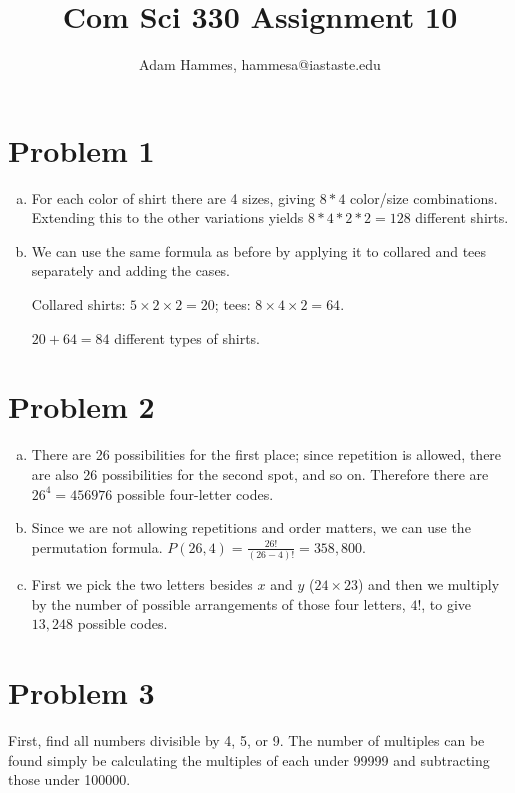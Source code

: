 \documentclass[11pt]{article}
\begin{document}
\let\iff\leftrightarrow

\title{Com Sci 330 Assignment 10}
\author{Adam Hammes, hammesa@iastaste.edu}
\maketitle

\section*{Problem 1}
\begin{enumerate}[(a)]
	\item
	For each color of shirt there are 4 sizes, giving $8*4$ color/size combinations. Extending this to the other variations yields $8*4*2*2= 128$
	different shirts.
	
	\item
	We can use the same formula as before by applying it to collared and tees separately and adding the cases.
	
	Collared shirts: $5 \times 2 \times 2 = 20$; tees: $8 \times 4 \times 2 = 64.$
	
	$20 + 64 = 84$ different types of shirts. 	
\end{enumerate}

\section*{Problem 2}
\begin{enumerate}[(a)]
	\item
	There are 26 possibilities for the first place; since repetition is allowed, there are also 26 possibilities for the second spot, and so on.
	Therefore there are $26^4 = 456976$ possible four-letter codes.
	
	\item
	Since we are not allowing repetitions and order matters, we can use the permutation formula. $P(26, 4) = \frac{26!}{(26-4)!} = 358, 800$.
	
	\item
	First we pick the two letters besides $x$ and $y$ ($24 \times 23$) and then we multiply by the number of possible arrangements of those four 
	letters, $4!$, to give $13,248$ possible codes.
\end{enumerate}

\section*{Problem 3}
	First, find all numbers divisible by 4, 5, or 9. The number of multiples can be found simply be calculating the multiples of each under 99999 
	and subtracting those under 100000.
	
\end{document}
